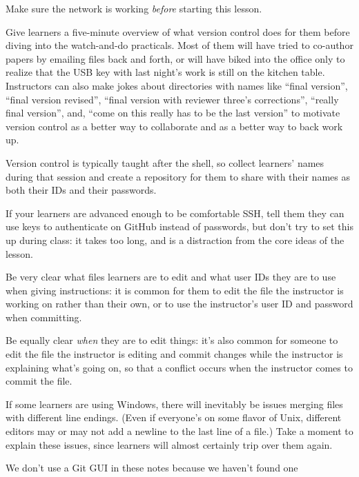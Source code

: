 \documentclass{book}
\begin{document}
\begin{swcitemize}
\item
  Make sure the network is working \emph{before} starting this lesson.
\item
  Give learners a five-minute overview of what version control does for
  them before diving into the watch-and-do practicals. Most of them will
  have tried to co-author papers by emailing files back and forth, or
  will have biked into the office only to realize that the USB key with
  last night's work is still on the kitchen table. Instructors can also
  make jokes about directories with names like ``final version'',
  ``final version revised'', ``final version with reviewer three's
  corrections'', ``really final version'', and, ``come on this really
  has to be the last version'' to motivate version control as a better
  way to collaborate and as a better way to back work up.
\item
  Version control is typically taught after the shell, so collect
  learners' names during that session and create a repository for them
  to share with their names as both their IDs and their passwords.
\item
  If your learners are advanced enough to be comfortable SSH, tell them
  they can use keys to authenticate on GitHub instead of passwords, but
  don't try to set this up during class: it takes too long, and is a
  distraction from the core ideas of the lesson.
\item
  Be very clear what files learners are to edit and what user IDs they
  are to use when giving instructions: it is common for them to edit the
  file the instructor is working on rather than their own, or to use the
  instructor's user ID and password when committing.
\item
  Be equally clear \emph{when} they are to edit things: it's also common
  for someone to edit the file the instructor is editing and commit
  changes while the instructor is explaining what's going on, so that a
  conflict occurs when the instructor comes to commit the file.
\item
  If some learners are using Windows, there will inevitably be issues
  merging files with different line endings. (Even if everyone's on some
  flavor of Unix, different editors may or may not add a newline to the
  last line of a file.) Take a moment to explain these issues, since
  learners will almost certainly trip over them again.
\item
  We don't use a Git GUI in these notes because we haven't found one

\end{swcitemize}
\end{document}
